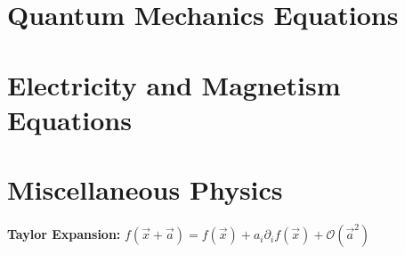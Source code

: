 \documentclass[12pt]{extarticle}
\begin{document}
\section{Quantum Mechanics Equations}

\section{Electricity and Magnetism Equations}

\section{Miscellaneous Physics}
\textbf{Taylor Expansion:} $f(\vec{x}+\vec{a}) = f(\vec{x}) + a_i\partial_i f(\vec{x}) + \mathcal{O}(\vec{a}^2)$
\end{document}
